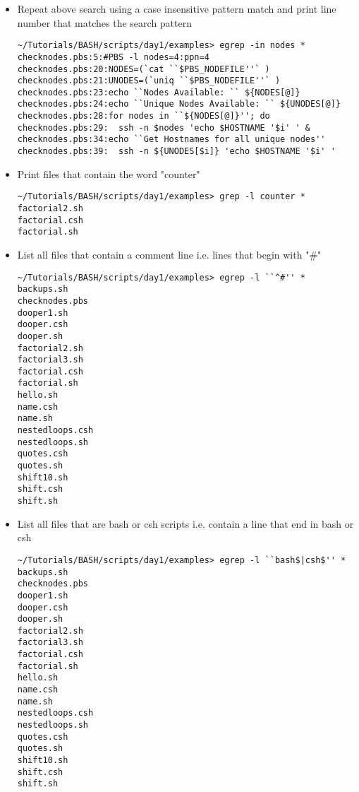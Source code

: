 \documentclass[10pt,t]{beamer}
\begin{document}
\begin{frame}
\begin{itemize}
\begin{lstlisting}[style=LINUX]
      \end{lstlisting}
    \item Repeat above search using a case insensitive pattern match and print line number that matches the search pattern
      \begin{lstlisting}[style=LINUX]
~/Tutorials/BASH/scripts/day1/examples> egrep -in nodes *
checknodes.pbs:5:#PBS -l nodes=4:ppn=4
checknodes.pbs:20:NODES=(`cat ``$PBS_NODEFILE''` )
checknodes.pbs:21:UNODES=(`uniq ``$PBS_NODEFILE''` )
checknodes.pbs:23:echo ``Nodes Available: `` ${NODES[@]}
checknodes.pbs:24:echo ``Unique Nodes Available: `` ${UNODES[@]}
checknodes.pbs:28:for nodes in ``${NODES[@]}''; do
checknodes.pbs:29:  ssh -n $nodes 'echo $HOSTNAME '$i' ' &
checknodes.pbs:34:echo ``Get Hostnames for all unique nodes''
checknodes.pbs:39:  ssh -n ${UNODES[$i]} 'echo $HOSTNAME '$i' '
      \end{lstlisting}
    \item Print files that contain the word "counter"
      \begin{lstlisting}[style=LINUX]
~/Tutorials/BASH/scripts/day1/examples> grep -l counter *
factorial2.sh
factorial.csh
factorial.sh
      \end{lstlisting}
      \framebreak
    \item List all files that contain a comment line i.e. lines that begin with "\#"
      \begin{lstlisting}[style=LINUX]
~/Tutorials/BASH/scripts/day1/examples> egrep -l ``^#'' *
backups.sh
checknodes.pbs
dooper1.sh
dooper.csh
dooper.sh
factorial2.sh
factorial3.sh
factorial.csh
factorial.sh
hello.sh
name.csh
name.sh
nestedloops.csh
nestedloops.sh
quotes.csh
quotes.sh
shift10.sh
shift.csh
shift.sh
      \end{lstlisting}
      \framebreak
    \item List all files that are bash or csh scripts i.e. contain a line that end in bash or csh
      \begin{lstlisting}[style=LINUX]
~/Tutorials/BASH/scripts/day1/examples> egrep -l ``bash$|csh$'' *
backups.sh
checknodes.pbs
dooper1.sh
dooper.csh
dooper.sh
factorial2.sh
factorial3.sh
factorial.csh
factorial.sh
hello.sh
name.csh
name.sh
nestedloops.csh
nestedloops.sh
quotes.csh
quotes.sh
shift10.sh
shift.csh
shift.sh
      \end{lstlisting}


\end{itemize}
\end{frame}
\end{document}

